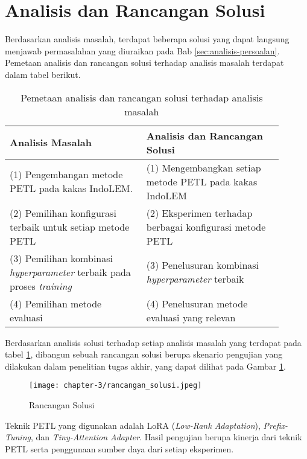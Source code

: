 \section{Analisis dan Rancangan Solusi}

Berdasarkan analisis masalah, terdapat beberapa solusi yang dapat langsung menjawab permasalahan yang diuraikan pada Bab \ref{sec:analisis-persoalan}. Pemetaan analisis dan rancangan solusi terhadap analisis masalah terdapat dalam tabel berikut.

\begin{table}[h!]
    \centering
    \begin{tabular}{|m{0.45\linewidth}|m{0.45\linewidth}|}
    \hline
    \rowcolor{black!10}
    \textbf{Analisis Masalah} & \textbf{Analisis dan Rancangan Solusi} \\ \hline
    (1) Pengembangan metode PETL pada kakas IndoLEM.& (1) Mengembangkan setiap metode PETL pada kakas IndoLEM \\ \hline
    (2) Pemilihan konfigurasi terbaik untuk setiap metode PETL & (2) Eksperimen terhadap berbagai konfigurasi metode PETL \\ \hline
    (3) Pemilihan kombinasi \textit{hyperparameter} terbaik pada proses \textit{training} & (3) Penelusuran kombinasi \textit{hyperparameter} terbaik\\ \hline
    (4) Pemilihan metode evaluasi & (4) Penelusuran metode evaluasi yang relevan \\ \hline
    \end{tabular}
\caption{Pemetaan analisis dan rancangan solusi terhadap analisis masalah}
\label{table:pemetaan-masalah-solusi}
\end{table}

Berdasarkan analisis solusi terhadap setiap analisis masalah yang terdapat pada tabel \ref{table:pemetaan-masalah-solusi}, dibangun sebuah rancangan solusi berupa skenario pengujian yang dilakukan dalam penelitian tugas akhir, yang dapat dilihat pada Gambar \ref{fig:rancangan-solusi}.

\begin{figure}[ht]
    \centering
    \texttt{[image: chapter-3/rancangan\_solusi.jpeg]}
    \caption{Rancangan Solusi}
    \label{fig:rancangan-solusi}
\end{figure}

Teknik PETL yang digunakan adalah LoRA (\textit{Low-Rank Adaptation}), \textit{Prefix-Tuning}, dan \textit{Tiny-Attention Adapter}. Hasil pengujian berupa kinerja dari teknik PETL serta penggunaan sumber daya dari setiap eksperimen.